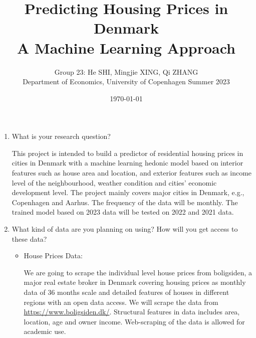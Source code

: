 \documentclass[12pt]{article} %
\title{Predicting Housing Prices in Denmark\\ A Machine Learning Approach}
\author{Group 23: He SHI, Mingjie XING, Qi ZHANG\\Department of Economics, University of Copenhagen Summer 2023}
\date{\today} %
\begin{document}
\maketitle


\begin{enumerate}

  \item What is your research question?\par
  		This project is intended to build a predictor of residential housing prices in cities in Denmark with a machine learning hedonic model based on interior features such as house area and location, and exterior features such as income level of the neighbourhood, weather condition and cities' economic development level. The project mainly covers major cities in Denmark, e.g., Copenhagen and Aarhus. The frequency of the data will be monthly. The trained model based on 2023 data will be tested on 2022 and 2021 data. 

  \item What kind of data are you planning on using? How will you get access to these data?
  	\begin{itemize}
		\item House Prices Data: \par
			We are going to scrape the individual level house prices from boligsiden, a major real estate broker in Denmark covering housing prices as monthly data of 36 months scale and detailed features of houses in different regions with an open data access. We will scrape the data from \url{https://www.boligsiden.dk/}. Structural features in data includes area, location, age and owner income. Web-scraping of the data is allowed for academic use.
	\end{itemize}


\end{enumerate}
\end{document}
